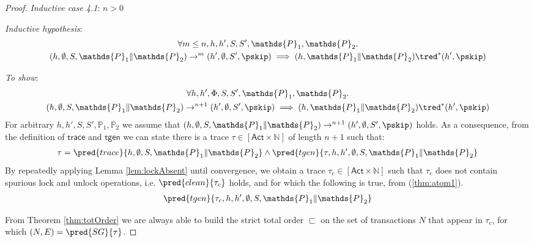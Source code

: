 \begin{thm}
{\begin{proof}
\textit{Inductive case 4.1}: $n > 0$

\textit{Inductive hypothesis}:
\begin{gather*}
	\forall m \leq n, h, h', S, S', \mathds{P}_1, \mathds{P}_2 \ldotp \\
	(h, \emptyset, S, \mathds{P}_1 \| \mathds{P}_2) \rightarrow^m (h', \emptyset, S', \pskip)
	\implies
	(h, \mathds{P}_1 \| \mathds{P}_2) \tred^* (h', \pskip)
\end{gather*}

\textit{To show}:
\begin{gather*}
	\forall h, h', \Phi, S, S', \mathds{P}_1, \mathds{P}_2 \ldotp \\
	(h, \emptyset, S, \mathds{P}_1 \| \mathds{P}_2) \rightarrow^{n+1} (h', \emptyset, S', \pskip)
	\implies
	(h, \mathds{P}_1 \| \mathds{P}_2) \tred^* (h', \pskip)
\end{gather*}
For arbitrary $h, h', S, S', \mathds{P}_1, \mathds{P}_2$ we assume that $(h, \emptyset, S, \mathds{P}_1 \| \mathds{P}_2) \rightarrow^{n+1} (h', \emptyset, S', \pskip)$ holds. As a consequence, from the definition of $\mathsf{trace}$ and $\mathsf{tgen}$ we can state there is a trace $\tau \in [\mathsf{Act} \times \mathds{N}]$ of length $n + 1$ such that:
\begin{gather}
	\label{thm:atom1}
	\tau = \pred{trace}{h, \emptyset, S, \mathds{P}_1 \| \mathds{P}_2} \land \pred{tgen}{\tau, h, h', \emptyset, S, \mathds{P}_1 \| \mathds{P}_2}
\end{gather}
By repeatedly applying Lemma \ref{lem:lockAbsent} until convergence, we obtain a trace $\tau_c \in [\mathsf{Act} \times \mathds{N}]$ such that $\tau_c$ does not contain spurious lock and unlock operations, i.e. $\pred{clean}{\tau_c}$ holds, and for which the following is true, from (\ref{thm:atom1}).
\begin{gather}
	\label{thm:atom2} \pred{tgen}{\tau_c, h, h', \emptyset, S, \mathds{P}_1 \| \mathds{P}_2}
\end{gather}

From Theorem \ref{thm:totOrder} we are always able to build the strict total order $\sqsubset$ on the set of transactions $N$ that appear in $\tau_c$, for which $(N, E) = \pred{SG}{\tau}$.


\end{proof}}
\end{thm}
